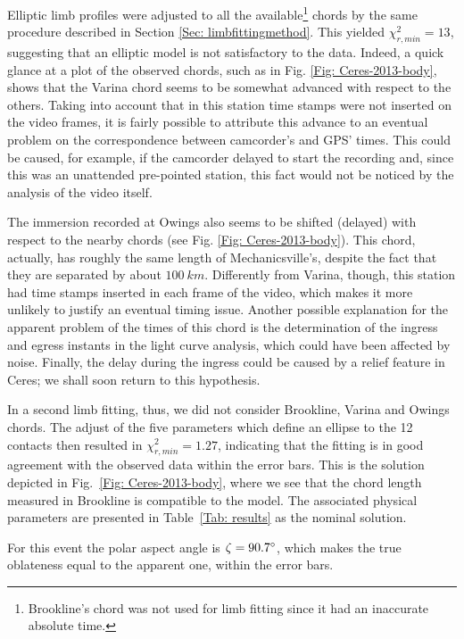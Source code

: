 \documentclass[useAMS,usenatbib]{mn2e}
\begin{document}
Elliptic limb profiles were adjusted to all the available\footnote{Brookline's chord was not used for limb fitting since it had an inaccurate absolute time.} chords by the same procedure described in Section \ref{Sec: limbfittingmethod}.%
This yielded $\chi^2_{r,min} = 13$, suggesting that an elliptic model is not satisfactory to the data. Indeed, a quick glance at a plot of the observed chords, such as in Fig. \ref{Fig: Ceres-2013-body}, shows that the Varina chord seems to be somewhat advanced with respect to the others. Taking into account that in this station time stamps were not inserted on the video frames, it is fairly possible to attribute this advance to an eventual problem on the correspondence between camcorder's and GPS' times. This could be caused, for example, if the camcorder delayed to start the recording and, since this was an unattended pre-pointed station, this fact would not be noticed by the analysis of the video itself.

The immersion recorded at Owings also seems to be shifted (delayed) with respect to the nearby chords (see Fig. \ref{Fig: Ceres-2013-body}). This chord, actually, has roughly the same length of Mechanicsville's, despite the fact that they are separated by about $100~km$. Differently from Varina, though, this station had time stamps inserted in each frame of the video, which makes it more unlikely to justify an eventual timing issue. Another possible explanation for the apparent problem of the times of this chord is the determination of the ingress and egress instants in the light curve analysis, which could have been affected by noise. Finally, the delay during the ingress could be caused by a relief feature in Ceres; we shall soon return to this hypothesis.

In a second limb fitting, thus, we did not consider Brookline, Varina and Owings chords. The adjust of the five parameters which define an ellipse to the 12 contacts then resulted in $\chi^2_{r,min} = 1.27$, indicating that the fitting is in good agreement with the observed data within the error bars. This is the solution depicted in Fig.~\ref{Fig: Ceres-2013-body}, where we see that the chord length measured in Brookline is compatible to the model. The associated physical parameters are presented in Table~\ref{Tab: results} as the nominal solution.

For this event the polar aspect angle is $\zeta = 90.7\hbox{$^\circ$}$, which makes the true oblateness equal to the apparent one, within the error bars.
\end{document}
